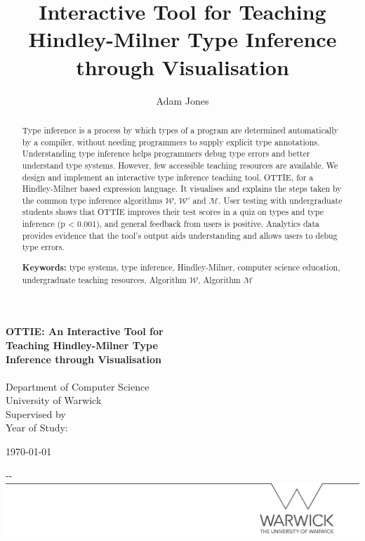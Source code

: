 \documentclass[a4paper,fleqn,oneside,12pt]{report}
\author{Adam Jones}
\title{Interactive Tool for Teaching Hindley-Milner Type Inference through Visualisation}
\makeatletter
\newcommand{\W}{$\mathcal{W}$}
\newcommand{\M}{$\mathcal{M}$}
\newcommand{\@supervisor}[0]{}
\newcommand{\@yearofstudy}[0]{}
\makeatother
\begin{document}
\makeatletter
\begin{titlepage}

	\textbf{\Huge OTTIE: An Interactive Tool for\\Teaching Hindley-Milner Type\\Inference through Visualisation} \\[1.5cm]
    \Large \textbf{\@author} \\
    Department of Computer Science \\
    University of Warwick \\

	Supervised by \@supervisor \\
	Year of Study: \@yearofstudy \\

    \vfill

    \today

    \begin{adjustwidth}{-\oddsidemargin-1in}{-\rightmargin}
        \centering
        \includegraphics[width=\paperwidth]{./line.png}
    \end{adjustwidth}

    \vspace*{-3.5cm}

\end{titlepage}
\makeatother

\pagestyle{plain}

\begin{abstract}
  Type inference is a process by which types of a program are determined automatically by a compiler, without needing programmers to supply explicit type annotations. Understanding type inference helps programmers debug type errors and better understand type systems. However, few accessible teaching resources are available. We design and implement an interactive type inference teaching tool, OTTIE, for a Hindley-Milner based expression language. It visualises and explains the steps taken by the common type inference algorithms \W, \W' and \M. User testing with undergraduate students shows that OTTIE improves their test scores in a quiz on types and type inference (p < 0.001), and general feedback from users is positive. Analytics data provides evidence that the tool's output aids understanding and allows users to debug type errors.

  \vspace{0.5cm}
  \textbf{Keywords:} type systems, type inference, Hindley-Milner, computer science education, undergraduate teaching resources, Algorithm \W, Algorithm \M
\end{abstract}
\end{document}
